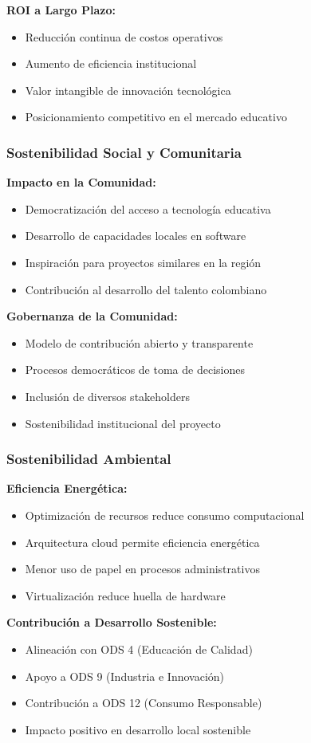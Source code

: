 \textbf{ROI a Largo Plazo:}
\begin{itemize}
\item Reducción continua de costos operativos
\item Aumento de eficiencia institucional
\item Valor intangible de innovación tecnológica
\item Posicionamiento competitivo en el mercado educativo
\end{itemize}

\subsubsection{Sostenibilidad Social y Comunitaria}

\textbf{Impacto en la Comunidad:}
\begin{itemize}
\item Democratización del acceso a tecnología educativa
\item Desarrollo de capacidades locales en software
\item Inspiración para proyectos similares en la región
\item Contribución al desarrollo del talento colombiano
\end{itemize}

\textbf{Gobernanza de la Comunidad:}
\begin{itemize}
\item Modelo de contribución abierto y transparente
\item Procesos democráticos de toma de decisiones
\item Inclusión de diversos stakeholders
\item Sostenibilidad institucional del proyecto
\end{itemize}

\subsubsection{Sostenibilidad Ambiental}

\textbf{Eficiencia Energética:}
\begin{itemize}
\item Optimización de recursos reduce consumo computacional
\item Arquitectura cloud permite eficiencia energética
\item Menor uso de papel en procesos administrativos
\item Virtualización reduce huella de hardware
\end{itemize}

\textbf{Contribución a Desarrollo Sostenible:}
\begin{itemize}
\item Alineación con ODS 4 (Educación de Calidad)
\item Apoyo a ODS 9 (Industria e Innovación)
\item Contribución a ODS 12 (Consumo Responsable)
\item Impacto positivo en desarrollo local sostenible
\end{itemize}